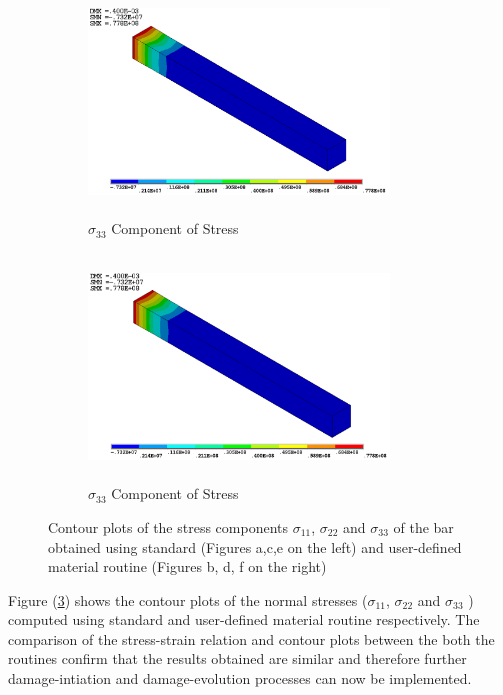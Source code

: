 \documentclass[12pt,a4paper,twoside,openright]{report}
\begin{document}
\begin{figure}[htbp!]\ContinuedFloat     
     \begin{subfigure}[b]{0.4\textwidth}
         \includegraphics[width=8cm,height=6cm]{17.Ansys_SZ.png}
         \caption{$\sigma_{33}$ Component of Stress}
         \label{fig:Z Component of Stress}
     \end{subfigure}
     \hspace{1.8cm}
     \begin{subfigure}[b]{0.4\textwidth}
         \includegraphics[width=8cm,height=6cm]{20.User_SZ.png}
         \caption{$\sigma_{33}$ Component of Stress}
         \label{fig:Z Component of Stress2}
     \end{subfigure}
        \caption{Contour plots of the stress components $\sigma_{11}$, $\sigma_{22}$ and $\sigma_{33}$ of the bar obtained using standard (Figures a,c,e on the left) and user-defined material routine (Figures b, d, f on the right)}
        \label{fig:USERMAT}     
\end{figure}
\FloatBarrier

Figure (\ref{fig:USERMAT}) shows the contour plots of the normal stresses ($\sigma_{11}$, $\sigma_{22}$ and $\sigma_{33}$ ) computed using standard and user-defined material routine respectively. The comparison of the stress-strain relation and contour plots between the both the routines confirm that the results obtained are similar and therefore further damage-intiation and damage-evolution processes can now be implemented.
\end{document}

